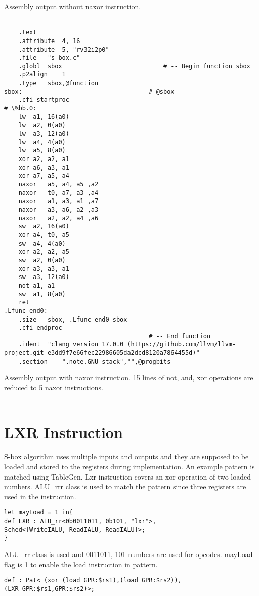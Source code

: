Assembly output without naxor instruction.
\\\\

\begin{lstlisting}
    .text
	.attribute	4, 16
	.attribute	5, "rv32i2p0"
	.file	"s-box.c"
	.globl	sbox                            # -- Begin function sbox
	.p2align	1
	.type	sbox,@function
sbox:                                   # @sbox
	.cfi_startproc
# \%bb.0:
	lw	a1, 16(a0)
	lw	a2, 0(a0)
	lw	a3, 12(a0)
	lw	a4, 4(a0)
	lw	a5, 8(a0)
	xor	a2, a2, a1
	xor	a6, a3, a1
	xor	a7, a5, a4
	naxor	a5, a4, a5 ,a2
	naxor	t0, a7, a3 ,a4
	naxor	a1, a3, a1 ,a7
	naxor	a3, a6, a2 ,a3
	naxor	a2, a2, a4 ,a6
	sw	a2, 16(a0)
	xor	a4, t0, a5
	sw	a4, 4(a0)
	xor	a2, a2, a5
	sw	a2, 0(a0)
	xor	a3, a3, a1
	sw	a3, 12(a0)
	not	a1, a1
	sw	a1, 8(a0)
	ret
.Lfunc_end0:
	.size	sbox, .Lfunc_end0-sbox
	.cfi_endproc
                                        # -- End function
	.ident	"clang version 17.0.0 (https://github.com/llvm/llvm-project.git e3dd9f7e66fec22986605da2dcd8120a7864455d)"
	.section	".note.GNU-stack","",@progbits

\end{lstlisting}

Assembly output with naxor instruction. 15 lines of not, and, xor operations are reduced to 5 naxor instructions.
\\\\






\section{LXR Instruction}

S-box algorithm uses multiple inputs and outputs and they are supposed to be loaded and stored to the registers during implementation. An example pattern is matched using TableGen. Lxr instruction covers an xor operation of two loaded numbers. ALU\_rrr class is used to match the pattern since three registers are used in the instruction.

\begin{lstlisting}
let mayLoad = 1 in{
def LXR : ALU_rr<0b0011011, 0b101, "lxr">,
Sched<[WriteIALU, ReadIALU, ReadIALU]>;
}
\end{lstlisting}

ALU\_rr class is used and 0011011, 101 numbers are used for opcodes. mayLoad flag is 1 to enable the load instruction in pattern.
\\
\begin{lstlisting}
def : Pat< (xor (load GPR:$rs1),(load GPR:$rs2)),
(LXR GPR:$rs1,GPR:$rs2)>;
\end{lstlisting}

